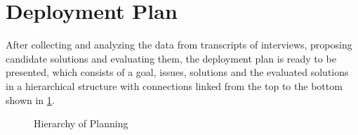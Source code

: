 
\section{Deployment Plan}

After collecting and analyzing the data from transcripts of interviews, proposing candidate solutions and evaluating them, the deployment plan is ready to be presented, which consists of a goal, issues, solutions and the evaluated solutions in a hierarchical structure with connections linked from the top to the bottom shown in \ref{img:hier}.

\begin{figure}[ht]
\centering
\caption{Hierarchy of Planning}
\label{img:hier}
\end{figure}




